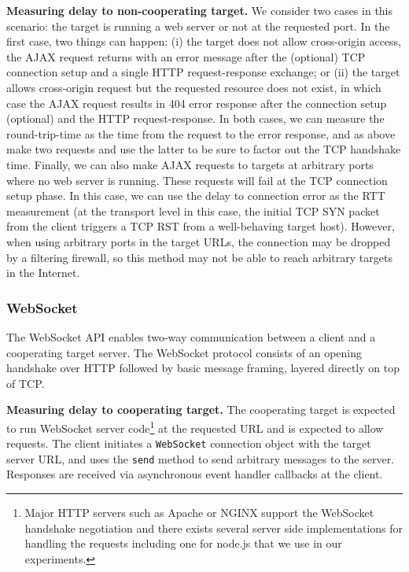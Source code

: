 \documentclass{sig-alternate-10pt}
\begin{document}
\textbf{Measuring delay to non-cooperating target.} We consider two cases in this scenario: the target is running a web server or not at the requested port. In the first case, two things can happen: (i) the target does not allow cross-origin access, the AJAX request returns with an error message after the (optional) TCP connection setup and a single HTTP request-response exchange; or (ii) the target allows cross-origin request but the requested resource does not exist, in which case the AJAX request results in 404 error response after the connection setup (optional) and the HTTP request-response. In both cases, we can measure the round-trip-time as the time from the request to the error response, and as above make two requests and use the latter to be sure to factor out the TCP handshake time. Finally, we can also make AJAX requests to targets at arbitrary ports where no web server is running. These requests will fail at the TCP connection setup phase. In this case, we can use the delay to connection error as the RTT measurement (at the transport level in this case, the initial TCP SYN packet from the client triggers a TCP RST from a well-behaving target host). However, when using arbitrary ports in the target URLs, the connection may be dropped by a filtering firewall, so this method may not be able to reach arbitrary targets in the Internet.

\subsubsection{WebSocket}

The WebSocket API enables two-way communication between a client and a cooperating target server.
 The WebSocket protocol consists of an opening handshake over HTTP followed by basic message framing, layered directly on top of TCP.

\textbf{Measuring delay to cooperating target.} The cooperating target is expected to run WebSocket server code\footnote{Major HTTP servers such as Apache or NGINX support the WebSocket handshake negotiation and there exists several server side implementations for handling the requests including one for node.js that we use in our experiments.} at the requested URL and is expected to allow requests. The client initiates a \texttt{WebSocket} connection object with the target server URL, and uses the \texttt{send} method to send arbitrary messages to the server. Responses are received via asynchronous event handler callbacks at the client.
\end{document}
